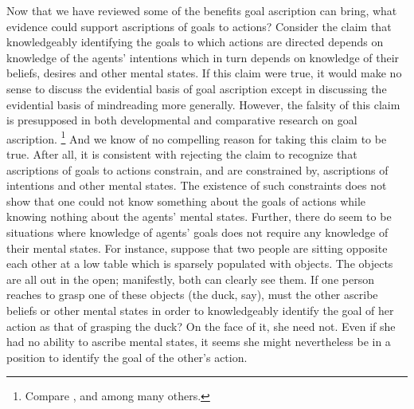 \documentclass[12pt,a4paper]{extarticle}
\begin{document}
Now that we have reviewed some of the benefits goal ascription can bring,
what evidence could support ascriptions of goals to actions?
Consider the claim that 
knowledgeably identifying the goals to which actions are directed
depends on 
knowledge of the agents' intentions
which in turn depends 
on knowledge of their beliefs, desires and other mental states.
If this claim were true,
it would make no sense to discuss the evidential basis of goal ascription except in discussing the evidential basis of mindreading more generally.
However,
the falsity of this claim  is presupposed  in both developmental and comparative research on goal ascription.%
\footnote{ 
Compare \citet{Gergely:1995sq},
	\citet{Woodward:1998dm} and
	\citet{Penn:2007ey}
among many others.
}
And we know of no compelling reason for taking this claim to be true.
After all,
it is consistent with rejecting the claim to recognize that
 ascriptions of goals to actions
 constrain, and are constrained by,
 ascriptions of intentions and other mental states.
The existence of such constraints does not show that one could 
not know something about the goals of actions 
while  knowing nothing about the agents' mental states.
Further,
there do seem to be situations where knowledge of agents' goals does not require any knowledge of their mental states.
For instance,
suppose that two people are sitting opposite each other at a low table
 which is 
sparsely populated with objects.
The objects are all out in the open; manifestly, both can clearly see them.
If one person reaches to grasp one of these objects (the duck, say), 
must the other ascribe beliefs or other mental states in order to knowledgeably identify the goal of her action as that of grasping the duck?
On the face of it, she need not.  
Even if she had no ability to ascribe mental states, it seems she might nevertheless be in a position to identify the goal of the other's action.
\end{document}
